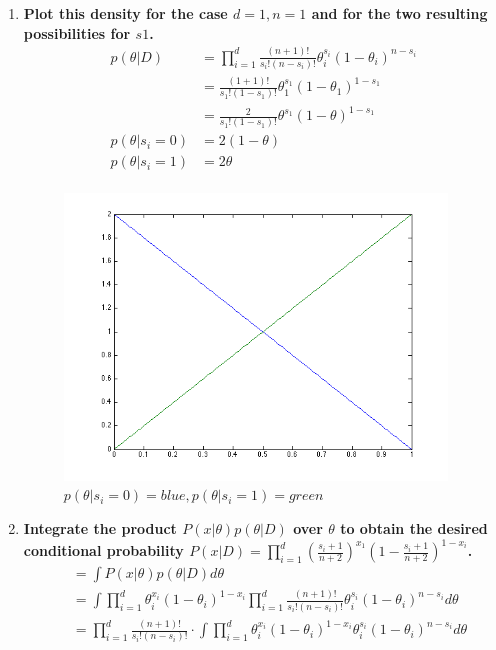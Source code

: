 \documentclass[12pt]{article}
\begin{document}
\begin{enumerate}
\begin{enumerate}
  \item \textbf{Plot this density for the case $d=1, n=1$ and for the two resulting possibilities for $s1$.}
    \begin{equation}
    \begin{split}
      p(\theta|D)& =\prod_{i=1}^d\frac{(n+1)!}{s_i!(n-s_i)!}\theta_i^{s_i}(1-\theta_i)^{n-s_i} \\
      & =\frac{(1+1)!}{s_1!(1-s_1)!}\theta_1^{s_1}(1-\theta_1)^{1-s_1} \\
      & =\frac{2}{s_1!(1-s_1)!}\theta^{s_1}(1-\theta)^{1-s_1} \\
      p(\theta|s_i=0)& =2(1-\theta) \\
      p(\theta|s_i=1)& =2\theta \\
    \end{split}
    \end{equation}
    \begin{figure}[H]
      \centering
      \includegraphics[width=4in]{17c}
      \caption{$p(\theta|s_i=0) = blue, p(\theta|s_i=1) = green$}
    \end{figure}
  \item \textbf{Integrate the product $P(x|\theta)p(\theta|D)$ over $\theta$ to obtain the desired conditional probability $P(x|D)=\prod_{i=1}^d(\frac{s_i+1}{n+2})^{x_1}(1-\frac{s_i+1}{n+2})^{1-x_i}$.}
    \begin{equation}
    \begin{split}
      & =\int P(x|\theta)p(\theta|D) d\theta \\
      & =\int \prod_{i=1}^d\theta_i^{x_i}(1-\theta_i)^{1-x_i}\prod_{i=1}^d\frac{(n+1)!}{s_i!(n-s_i)!}\theta_i^{s_i}(1-\theta_i)^{n-s_i} d\theta \\
      & =\prod_{i=1}^d\frac{(n+1)!}{s_i!(n-s_i)!} \cdot \int \prod_{i=1}^d\theta_i^{x_i}(1-\theta_i)^{1-x_i}\theta_i^{s_i}(1-\theta_i)^{n-s_i} d\theta \\

\end{split}
\end{equation}
\end{enumerate}
\end{enumerate}
\end{document}
